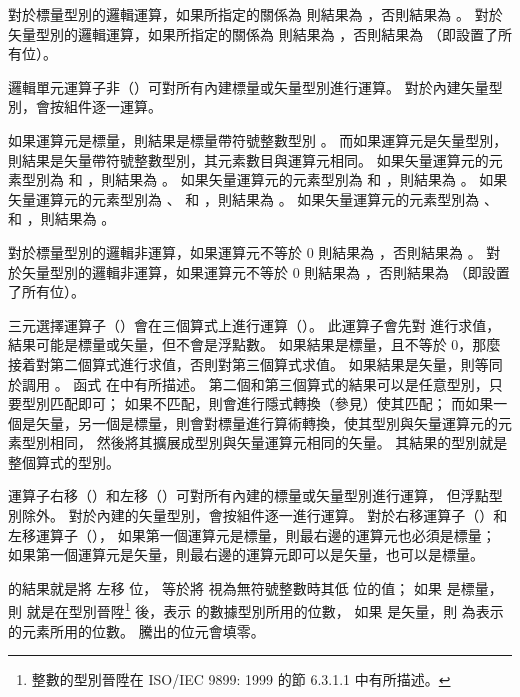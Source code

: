 {對於標量型別的邏輯運算，如果所指定的關係為  則結果為 ，否則結果為 。
對於矢量型別的邏輯運算，如果所指定的關係為  則結果為 ，否則結果為  （即設置了所有位）。
\stopitem

\startitem
邏輯單元運算子非（\ccmm{!}）可對所有內建標量或矢量型別進行運算。
對於內建矢量型別，會按組件逐一運算。

如果運算元是標量，則結果是標量帶符號整數型別 。
而如果運算元是矢量型別，則結果是矢量帶符號整數型別，其元素數目與運算元相同。
如果矢量運算元的元素型別為  和 ，則結果為 。
如果矢量運算元的元素型別為  和 ，則結果為 。
如果矢量運算元的元素型別為 、  和 ，則結果為 。
如果矢量運算元的元素型別為 、  和 ，則結果為 。

對於標量型別的邏輯非運算，如果運算元不等於 0 則結果為 ，否則結果為 。
對於矢量型別的邏輯非運算，如果運算元不等於 0 則結果為 ，否則結果為  （即設置了所有位）。
\stopitem

\startitem
三元選擇運算子（）會在三個算式上進行運算（）。
此運算子會先對  進行求值，結果可能是標量或矢量，但不會是浮點數。
如果結果是標量，且不等於 0，那麼接着對第二個算式進行求值，否則對第三個算式求值。
如果結果是矢量，則等同於調用 。
函式  在中有所描述。
第二個和第三個算式的結果可以是任意型別，只要型別匹配即可；
如果不匹配，則會進行隱式轉換（參見）使其匹配；
而如果一個是矢量，另一個是標量，則會對標量進行算術轉換，使其型別與矢量運算元的元素型別相同，
然後將其擴展成型別與矢量運算元相同的矢量。
其結果的型別就是整個算式的型別。
\stopitem

\startitem
運算子右移（\ccmm{>>}）和左移（\ccmm{<<}）可對所有內建的標量或矢量型別進行運算，
但浮點型別除外。
對於內建的矢量型別，會按組件逐一進行運算。
對於右移運算子（\ccmm{>>}）和左移運算子（\ccmm{<<}），
如果第一個運算元是標量，則最右邊的運算元也必須是標量；
如果第一個運算元是矢量，則最右邊的運算元即可以是矢量，也可以是標量。

 的結果就是將  左移  位，
  等於將  視為無符號整數時其低  位的值；
如果  是標量，則  就是在型別晉陞\footnote{
整數的型別晉陞在 ISO/IEC 9899: 1999 的節 6.3.1.1 中有所描述。}
後，表示  的數據型別所用的位數，
如果  是矢量，則  為表示  的元素所用的位數。
騰出的位元會填零。

}
